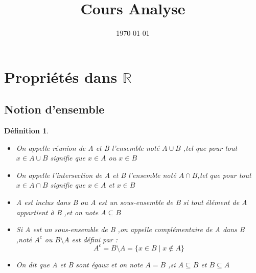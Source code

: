 \documentclass[a4paper,12pt]{article} %
\newtheorem{definition}{Définition}[section]
\begin{document}
	
	\title{Cours Analyse}
	\date{\today} %
	\maketitle
	
	\tableofcontents %
	\newpage
	
	\section{Propriétés dans $\mathbb{R}$}
	\subsection {Notion d'ensemble}
	\begin{definition}
		
		\begin{itemize}
			\item On appelle réunion de A et B l'ensemble noté $A \cup B$ ,tel que pour tout $x \in A \cup B $ signifie que $x\in A$ ou $x\in B$
			\item On appelle l'intersection de A et B l'ensemble noté $A \cap B$,tel que pour tout $x \in A \cap B$ signifie que $x\in A$ et $x \in B$
			\item A est inclus dans B ou A est un sous-ensemble de B si tout élément de A appartient à B ,et on note $A \subseteq B$
			\item Si A est un sous-ensemble de B ,on appelle complémentaire de A dans B ,noté 
			$A^c$ ou $B \setminus A$ est défini par :
			\[
			A^c = B \setminus A = \{ x \in B \mid x \notin A \}
			\]
			\item On dit que A et B sont égaux et on note $A=B$ ,si $A \subseteq B$ et $B \subseteq A$
			
			
			
		\end{itemize}
	\end{definition}
	
\end{document}
